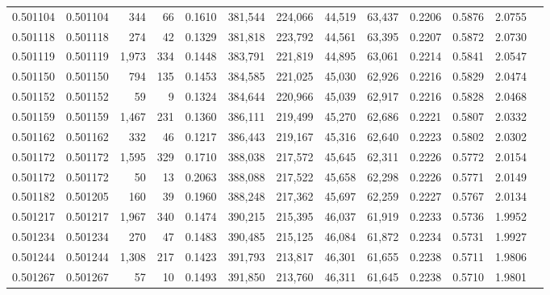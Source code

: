 \begin{tabular}{rrrrrrrrrrrrr}
0.501104 & 0.501104 &   344 &    66 &                                     0.1610 & 381,544 & 224,066 &  44,519 &  63,437 & 0.2206 & 0.5876 & 2.0755 \\
0.501118 & 0.501118 &   274 &    42 &                                     0.1329 & 381,818 & 223,792 &  44,561 &  63,395 & 0.2207 & 0.5872 & 2.0730 \\
0.501119 & 0.501119 & 1,973 &   334 &                                     0.1448 & 383,791 & 221,819 &  44,895 &  63,061 & 0.2214 & 0.5841 & 2.0547 \\
0.501150 & 0.501150 &   794 &   135 &                                     0.1453 & 384,585 & 221,025 &  45,030 &  62,926 & 0.2216 & 0.5829 & 2.0474 \\
0.501152 & 0.501152 &    59 &     9 &                                     0.1324 & 384,644 & 220,966 &  45,039 &  62,917 & 0.2216 & 0.5828 & 2.0468 \\
0.501159 & 0.501159 & 1,467 &   231 &                                     0.1360 & 386,111 & 219,499 &  45,270 &  62,686 & 0.2221 & 0.5807 & 2.0332 \\
0.501162 & 0.501162 &   332 &    46 &                                     0.1217 & 386,443 & 219,167 &  45,316 &  62,640 & 0.2223 & 0.5802 & 2.0302 \\
0.501172 & 0.501172 & 1,595 &   329 &                                     0.1710 & 388,038 & 217,572 &  45,645 &  62,311 & 0.2226 & 0.5772 & 2.0154 \\
0.501172 & 0.501172 &    50 &    13 &                                     0.2063 & 388,088 & 217,522 &  45,658 &  62,298 & 0.2226 & 0.5771 & 2.0149 \\
0.501182 & 0.501205 &   160 &    39 &                                     0.1960 & 388,248 & 217,362 &  45,697 &  62,259 & 0.2227 & 0.5767 & 2.0134 \\
0.501217 & 0.501217 & 1,967 &   340 &                                     0.1474 & 390,215 & 215,395 &  46,037 &  61,919 & 0.2233 & 0.5736 & 1.9952 \\
0.501234 & 0.501234 &   270 &    47 &                                     0.1483 & 390,485 & 215,125 &  46,084 &  61,872 & 0.2234 & 0.5731 & 1.9927 \\
0.501244 & 0.501244 & 1,308 &   217 &                                     0.1423 & 391,793 & 213,817 &  46,301 &  61,655 & 0.2238 & 0.5711 & 1.9806 \\
0.501267 & 0.501267 &    57 &    10 &                                     0.1493 & 391,850 & 213,760 &  46,311 &  61,645 & 0.2238 & 0.5710 & 1.9801 \\

\end{tabular}
